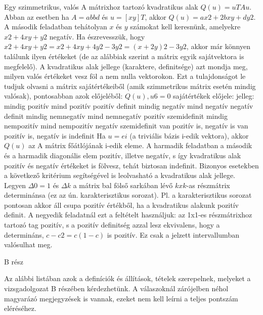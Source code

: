 \begin{frame}
  \begin{tcolorbox}[title={12/4. -N-}]
     Egy szimmetrikus, valós A mátrixhoz tartozó kvadratikus alak $Q(u) = uTAu$. Abban az esetben ha $A =  a b b d$  és $u = [x y]T$, akkor $Q(u) = ax2 + 2bxy + dy2$. A második feladatban tehátolyan $x$ és $y$ számokat kell keresnünk, amelyekre $x2 + 4xy + y2$ negatív. Ha észrevesszük, hogy $x2 + 4xy + y2 = x2 + 4xy + 4y2 -3y2 = (x + 2y)2 -3y2$, akkor már könnyen találunk ilyen értékeket (de az alábbiak szerint a mátrix egyik sajátvektora is megfelelő). A kvadratikus alak jellege (karaktere, definitsége) azt mondja meg, milyen valós értékeket vesz föl a nem nulla vektorokon. Ezt a tulajdonságot le tudjuk olvasni a mátrix sajátértékeiből (amik szimmetrikus mátrix esetén mindig valósak), pontosabban azok előjeléből: $Q(u), u 6= 0$ sajátértékek előjele: jelleg: mindig pozitív mind pozitív pozitív definit mindig negatív mind negatív negatív definit mindig nemnegatív mind nemnegatív pozitív szemidefinit mindig nempozitív mind nempozitív negatív szemidefinit van pozitív is, negatív is van pozitív is, negatív is indefinit Ha $u = ei$ (a triviális bázis i-edik vektora), akkor $Q(u)$ az A mátrix főátlójának i-edik eleme. A harmadik feladatban a második és a harmadik diagonális elem pozitív, illetve negatív, s így kvadratikus alak pozitív és negatív értékeket is fölvesz, tehát biztosan indefinit. Bizonyos esetekben a következő kritérium segítségével is leolvasható a kvadratikus alak jellege. Legyen ${\Delta}0 = 1$ és ${\Delta}k$ a mátrix bal fölső sarkában lévő $k xk$-as részmátrix determinánsa (ez az ún. karakterisztikus sorozat). Pl. a karakterisztikus sorozat pontosan akkor áll csupa pozitív értékből, ha a kvadratikus alakunk pozitív definit. A negyedik feladatnál ezt a feltételt használjuk: az 1x1-es részmátrixhoz tartozó tag pozitív, s a pozitív definitség azzal lesz ekvivalens, hogy a determináns, $c-c2 = c(1-c)$ is pozitív. Ez csak a jelzett intervallumban valósulhat meg.
  \end{tcolorbox}
\end{frame}


\begin{frame}[plain]
\begin{tcolorbox}[center, colback={myyellow}, coltext={black}, colframe={myyellow}]
    {\RHuge  B rész}
    \mmedskip
\end{tcolorbox}
\end{frame}


\begin{frame}
  \begin{tcolorbox}[title={12/4. -N-}]
     Az alábbi listában azok a definíciók és állítások, tételek szerepelnek, melyeket a vizsgadolgozat B részében kérdezhetünk. A válaszoknál zárójelben néhol magyarázó megjegyzések is vannak, ezeket nem kell leírni a teljes pontszám eléréséhez.
  \end{tcolorbox}
\end{frame}

